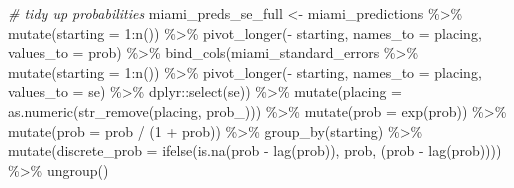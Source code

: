 \documentclass[
]{book}
\newenvironment{Shaded}{\begin{snugshade}}{\end{snugshade}}
\newcommand{\AttributeTok}[1]{\textcolor[rgb]{0.77,0.63,0.00}{#1}}
\newcommand{\CommentTok}[1]{\textcolor[rgb]{0.56,0.35,0.01}{\textit{#1}}}
\newcommand{\DecValTok}[1]{\textcolor[rgb]{0.00,0.00,0.81}{#1}}
\newcommand{\FunctionTok}[1]{\textcolor[rgb]{0.00,0.00,0.00}{#1}}
\newcommand{\NormalTok}[1]{#1}
\newcommand{\OtherTok}[1]{\textcolor[rgb]{0.56,0.35,0.01}{#1}}
\newcommand{\SpecialCharTok}[1]{\textcolor[rgb]{0.00,0.00,0.00}{#1}}
\newcommand{\StringTok}[1]{\textcolor[rgb]{0.31,0.60,0.02}{#1}}
\begin{document}
\begin{Shaded}
\begin{Highlighting}[]
\CommentTok{\# tidy up probabilities}
\NormalTok{miami\_preds\_se\_full }\OtherTok{\textless{}{-}}\NormalTok{ miami\_predictions }\SpecialCharTok{\%\textgreater{}\%}
  \FunctionTok{mutate}\NormalTok{(}\AttributeTok{starting =} \DecValTok{1}\SpecialCharTok{:}\FunctionTok{n}\NormalTok{()) }\SpecialCharTok{\%\textgreater{}\%}
  \FunctionTok{pivot\_longer}\NormalTok{(}\SpecialCharTok{{-}}\NormalTok{ starting, }\AttributeTok{names\_to =} \StringTok{\textquotesingle{}placing\textquotesingle{}}\NormalTok{, }\AttributeTok{values\_to =} \StringTok{\textquotesingle{}prob\textquotesingle{}}\NormalTok{) }\SpecialCharTok{\%\textgreater{}\%} 
  \FunctionTok{bind\_cols}\NormalTok{(miami\_standard\_errors }\SpecialCharTok{\%\textgreater{}\%} \FunctionTok{mutate}\NormalTok{(}\AttributeTok{starting =} \DecValTok{1}\SpecialCharTok{:}\FunctionTok{n}\NormalTok{()) }\SpecialCharTok{\%\textgreater{}\%}
  \FunctionTok{pivot\_longer}\NormalTok{(}\SpecialCharTok{{-}}\NormalTok{ starting, }\AttributeTok{names\_to =} \StringTok{\textquotesingle{}placing\textquotesingle{}}\NormalTok{, }\AttributeTok{values\_to =} \StringTok{\textquotesingle{}se\textquotesingle{}}\NormalTok{) }\SpecialCharTok{\%\textgreater{}\%}
\NormalTok{    dplyr}\SpecialCharTok{::}\FunctionTok{select}\NormalTok{(se)) }\SpecialCharTok{\%\textgreater{}\%}
  \FunctionTok{mutate}\NormalTok{(}\AttributeTok{placing =} \FunctionTok{as.numeric}\NormalTok{(}\FunctionTok{str\_remove}\NormalTok{(placing, }\StringTok{\textquotesingle{}prob\_\textquotesingle{}}\NormalTok{))) }\SpecialCharTok{\%\textgreater{}\%}
  \FunctionTok{mutate}\NormalTok{(}\AttributeTok{prob =} \FunctionTok{exp}\NormalTok{(prob)) }\SpecialCharTok{\%\textgreater{}\%}
  \FunctionTok{mutate}\NormalTok{(}\AttributeTok{prob =}\NormalTok{ prob }\SpecialCharTok{/}\NormalTok{ (}\DecValTok{1} \SpecialCharTok{+}\NormalTok{ prob)) }\SpecialCharTok{\%\textgreater{}\%}
  \FunctionTok{group\_by}\NormalTok{(starting) }\SpecialCharTok{\%\textgreater{}\%} 
  \FunctionTok{mutate}\NormalTok{(}\AttributeTok{discrete\_prob =} \FunctionTok{ifelse}\NormalTok{(}\FunctionTok{is.na}\NormalTok{(prob }\SpecialCharTok{{-}} \FunctionTok{lag}\NormalTok{(prob)), prob, (prob }\SpecialCharTok{{-}} \FunctionTok{lag}\NormalTok{(prob)))) }\SpecialCharTok{\%\textgreater{}\%}
  \FunctionTok{ungroup}\NormalTok{()}


\end{Highlighting}
\end{Shaded}
\end{document}
